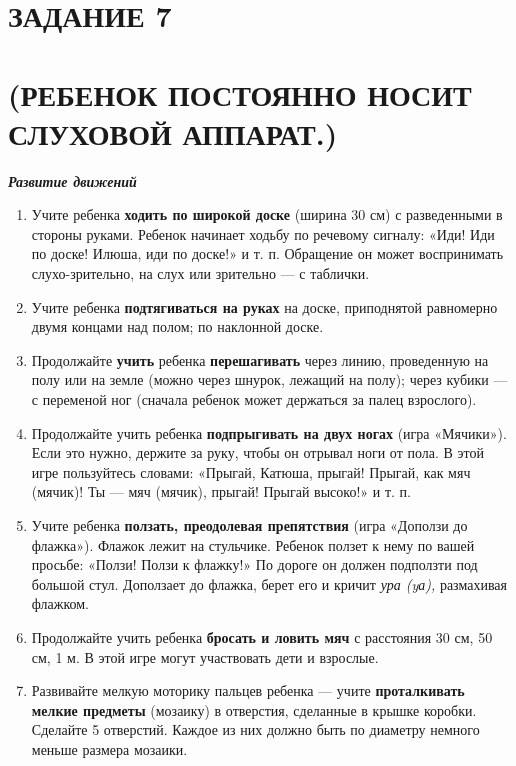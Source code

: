 \documentclass[a5paper]{book}
\renewcommand{\emph}[1]{\textit{#1}}
\begin{document}
\section{ЗАДАНИЕ 7}\section*{(РЕБЕНОК ПОСТОЯННО НОСИТ СЛУХОВОЙ АППАРАТ.)}

\emph{\textbf{Развитие движений}}


\begin{enumerate}
\def\labelenumi{\arabic{enumi}.}
\item
  
  Учите ребенка \textbf{ходить по широкой доске} (ширина 30 см) с
  разведенными в стороны руками. Ребенок начинает ходьбу по речевому
  сигналу: «Иди! Иди по доске! Илюша, иди по доске!» и т. п. Обращение
  он может воспринимать слухо-зрительно, на слух или зрительно --- с
  таблички.
  
\item
  
  Учите ребенка \textbf{подтягиваться на руках} на доске, приподнятой
  равномерно двумя концами над полом; по наклонной доске.
  
\item
  
  Продолжайте \textbf{учить} ребенка \textbf{перешагивать} через линию,
  проведенную на полу или на земле (можно через шнурок, лежащий на
  полу); через кубики --- с переменой ног (сначала ребенок может
  держаться за палец взрослого).
  
\item
  
  Продолжайте учить ребенка \textbf{подпрыгивать на двух ногах} (игра
  «Мячики»). Если это нужно, держите за руку, чтобы он отрывал ноги от
  пола. В этой игре пользуйтесь словами: «Прыгай, Катюша, прыгай!
  Прыгай, как мяч (мячик)! Ты --- мяч (мячик), прыгай! Прыгай высоко!» и
  т. п.
  
\item
  
  Учите ребенка \textbf{ползать, преодолевая препятствия} (игра «Доползи
  до флажка»). Флажок лежит на стульчике. Ребенок ползет к нему по вашей
  просьбе: «Ползи! Ползи к флажку!» По дороге он должен подползти под
  большой стул. Доползает до флажка, берет его и кричит \emph{ура (yа),}
  размахивая флажком.
  
\item
  
  Продолжайте учить ребенка \textbf{бросать и ловить мяч} с расстояния
  30 см, 50 см, 1 м. В этой игре могут участвовать дети и взрослые.
  
\item
  
  Развивайте мелкую моторику пальцев ребенка --- учите
  \textbf{проталкивать мелкие предметы} (мозаику) в отверстия, сделанные
  в крышке коробки. Сделайте 5 отверстий. Каждое из них должно быть по
  диаметру немного меньше размера мозаики.
  
\end{enumerate}
\end{document}

